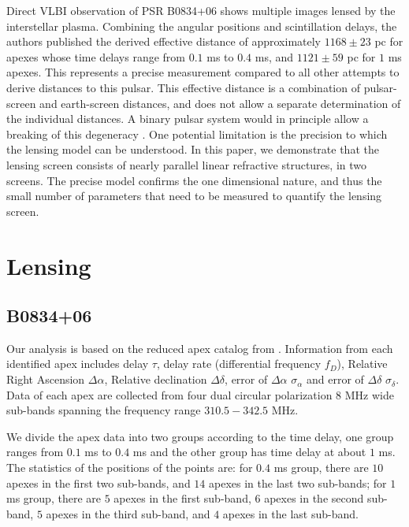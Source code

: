 \documentclass[useAMS,usenatbib]{mn2e}
\begin{document}
Direct VLBI observation of PSR B0834+06 shows multiple images lensed
by the interstellar plasma.  Combining the angular positions and
scintillation delays, the authors published the derived effective
distance \citep{2010ApJ...708..232B} of approximately $1168\pm 23$ pc
for apexes whose time delays range from $0.1$ ms to $0.4$ ms, and
$1121\pm 59$ pc for $1$ ms apexes.  This represents a precise
measurement compared to all other attempts to derive distances to this
pulsar.  This effective distance is a combination of pulsar-screen and
earth-screen distances, and does not allow a separate determination of
the individual distances.  A binary pulsar system would in principle
allow a breaking of this degeneracy \citep{2014MNRAS.442.3338P}. One
potential limitation is the precision to which the lensing model can
be understood.  In this paper, we demonstrate that the lensing screen
consists of nearly parallel linear refractive structures, in two
screens.  The precise model confirms the one dimensional nature, and
thus the small number of parameters that need to be measured to
quantify the lensing screen. 

\section{Lensing}
\subsection{B0834+06}
\label{21}
Our analysis is based on the reduced apex catalog from
\citep{2010ApJ...708..232B}. Information from each identified apex includes delay $\tau$,
delay rate (differential frequency $f_D$), Relative Right Ascension $\Delta\alpha$, Relative declination $\Delta\delta$, error of $\Delta\alpha$ $\sigma_{\alpha}$ and error of $\Delta\delta$ $\sigma_{\delta}$. Data of each apex are collected from four dual circular polarization $8$ MHz wide sub-bands spanning the frequency range $310.5-342.5$ MHz. 

We divide the apex data into two groups according to the time delay, one group ranges from $0.1$ ms to $0.4$ ms and the other group has time delay at about $1$ ms. The statistics of the positions of the points are: for $0.4$ ms group, there are $10$ apexes in the first two sub-bands, and $14$ apexes in the last two sub-bands; for $1$ ms group, there are $5$ apexes in the first sub-band, $6$ apexes in the second sub-band, $5$ apexes in the third sub-band, and $4$ apexes in the last sub-band. 
\end{document}
